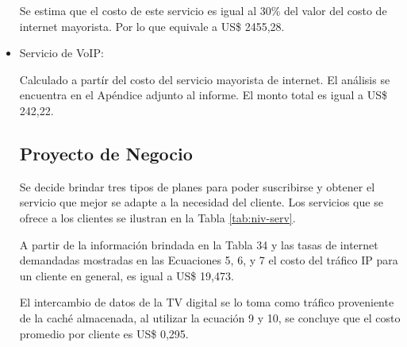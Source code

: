 \begin{itemize}
Se estima que el costo de este servicio es igual al 30\% del valor del costo de internet mayorista. Por lo que equivale a US\$ 2455,28.


\item Servicio de VoIP:
%
%
%
%

Calculado a partír del costo del servicio mayorista de internet. El análisis se encuentra en el Apéndice adjunto al informe. El monto total es igual a US\$ 242,22.

 
\subsection{Proyecto de Negocio}

Se decide brindar tres tipos de planes para poder suscribirse y obtener el servicio que mejor se adapte a la necesidad del cliente. Los servicios que se ofrece a los clientes se ilustran en la Tabla \ref{tab:niv-serv}.

A partir de la información brindada en la Tabla 34 y las tasas de internet demandadas mostradas en las Ecuaciones 5, 6, y 7 el costo del tráfico IP para un cliente en general, es igual a US\$ 19,473.

El intercambio de datos de la TV digital se lo toma como tráfico proveniente de la caché almacenada, al utilizar la ecuación 9 y 10, se concluye que el costo promedio por cliente es US\$ 0,295. 


\end{itemize}
